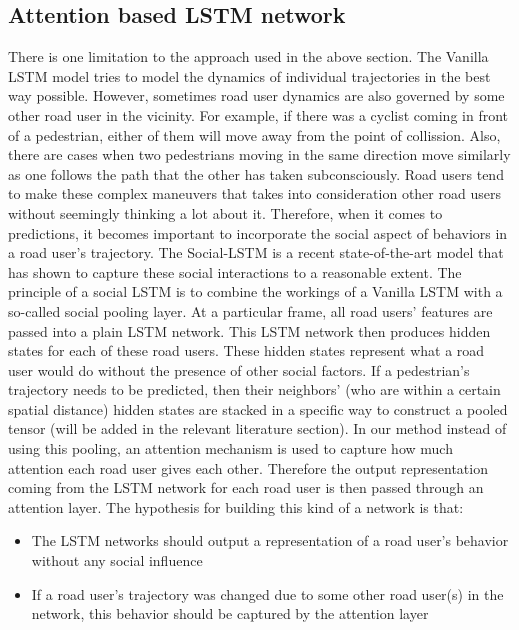 \documentclass{article}
\begin{document}
\subsection{Attention based LSTM network}\label{ssec:tlstm}
There is one limitation to the approach used in the above section. The Vanilla LSTM model tries to model the dynamics of individual trajectories in the best way possible. However, sometimes road user dynamics are also governed by some other road user in the vicinity. For example, if there was a cyclist coming in front of a pedestrian, either of them will move away from the point of collission. Also, there are cases when two pedestrians moving in the same direction move similarly as one follows the path that the other has taken subconsciously. Road users tend to make these complex maneuvers that takes into consideration other road users without seemingly thinking a lot about it. Therefore, when it comes to predictions, it becomes important to incorporate the social aspect of behaviors in a road user's trajectory. The Social-LSTM \cite{alahi_social_2016} is a recent state-of-the-art model that has shown to capture these social interactions to a reasonable extent. The principle of a social LSTM is to combine the workings of a Vanilla LSTM with a so-called social pooling layer. At a particular frame, all road users' features are passed into a plain LSTM network. This LSTM network then produces hidden states for each of these road users. These hidden states represent what a road user would do without the presence of other social factors.  If a pedestrian's trajectory needs to be predicted, then their neighbors' (who are within a certain spatial distance) hidden states are stacked in a specific way to construct a pooled tensor (will be added in the relevant literature section). In our method instead of using this pooling, an attention mechanism is used to capture how much attention each road user gives each other. Therefore the output representation coming from the LSTM network for each road user is then passed through an attention layer. The hypothesis for building this kind of a network is that:
\begin{itemize}
    \item The LSTM networks should output a representation of a road user's behavior without any social influence
    \item If a road user's trajectory was changed due to some other road user(s) in the network, this behavior should be captured by the attention layer 
\end{itemize}
\end{document}
